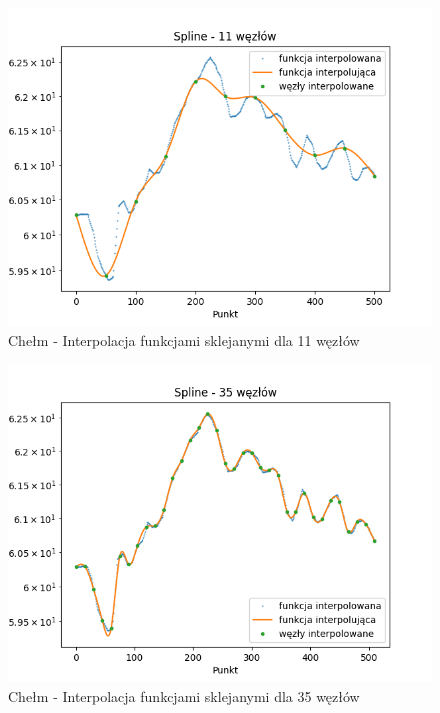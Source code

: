 \documentclass[12pt]{extarticle}
\begin{document}
\begin{figure}[H]
    \centering
    \includegraphics[scale=0.8]{interpolation_chelm_Spline_11.png}
    \caption{Chełm - Interpolacja funkcjami sklejanymi dla 11 węzłów}
\end{figure}
\begin{figure}[H]
    \centering
    \includegraphics[scale=0.8]{interpolation_chelm_Spline_35.png}
    \caption{Chełm - Interpolacja funkcjami sklejanymi dla 35 węzłów}
\end{figure}
\end{document}

